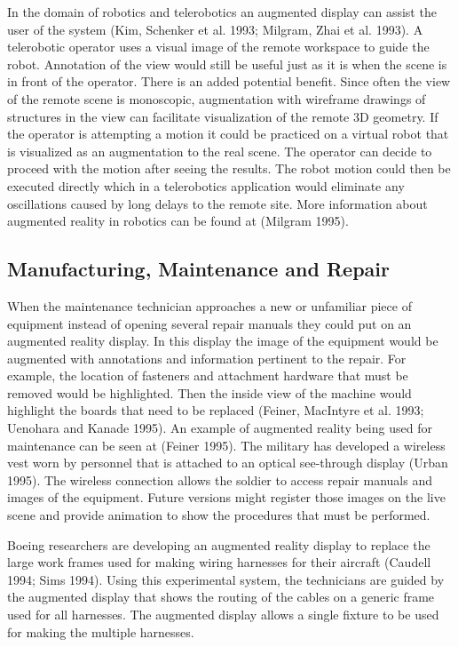 In the domain of robotics and telerobotics an augmented display can assist the user of the system (Kim, Schenker et al. 1993; Milgram, Zhai et al. 1993). A telerobotic operator uses a visual image of the remote workspace to guide the robot. Annotation of the view would still be useful just as it is when the scene is in front of the operator. There is an added potential benefit. Since often the view of the remote scene is monoscopic, augmentation with wireframe drawings of structures in the view can facilitate visualization of the remote 3D geometry. If the operator is attempting a motion it could be practiced on a virtual robot that is visualized as an augmentation to the real scene. The operator can decide to proceed with the motion after seeing the results. The robot motion could then be executed directly which in a telerobotics application would eliminate any oscillations caused by long delays to the remote site. More information about augmented reality in robotics can be found at (Milgram 1995).

\subsection{Manufacturing, Maintenance and Repair}

When the maintenance technician approaches a new or unfamiliar piece of equipment instead of opening several repair manuals they could put on an augmented reality display. In this display the image of the equipment would be augmented with annotations and information pertinent to the repair. For example, the location of fasteners and attachment hardware that must be removed would be highlighted. Then the inside view of the machine would highlight the boards that need to be replaced (Feiner, MacIntyre et al. 1993; Uenohara and Kanade 1995). An example of augmented reality being used for maintenance can be seen at (Feiner 1995). The military has developed a wireless vest worn by personnel that is attached to an optical see-through display (Urban 1995). The wireless connection allows the soldier to access repair manuals and images of the equipment. Future versions might register those images on the live scene and provide animation to show the procedures that must be performed.

Boeing researchers are developing an augmented reality display to replace the large work frames used for making wiring harnesses for their aircraft (Caudell 1994; Sims 1994). Using this experimental system, the technicians are guided by the augmented display that shows the routing of the cables on a generic frame used for all harnesses. The augmented display allows a single fixture to be used for making the multiple harnesses.

